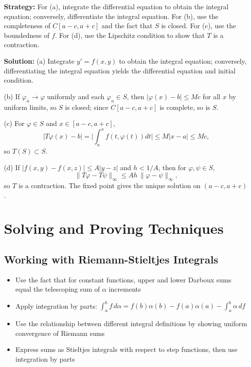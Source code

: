 \noindent\textbf{Strategy:} For (a), integrate the differential equation to obtain the integral equation; conversely, differentiate the integral equation. For (b), use the completeness of $C[a-c,a+c]$ and the fact that $S$ is closed. For (c), use the boundedness of $f$. For (d), use the Lipschitz condition to show that $T$ is a contraction.

\bigskip\noindent\textbf{Solution:}
(a) Integrate $y'=f(x,y)$ to obtain the integral equation; conversely, differentiating the integral equation yields the differential equation and initial condition.

(b) If $\varphi_n\to\varphi$ uniformly and each $\varphi_n\in S$, then $|\varphi(x)-b|\le Mc$ for all $x$ by uniform limits, so $S$ is closed; since $C[a-c,a+c]$ is complete, so is $S$.

(c) For $\varphi\in S$ and $x\in[a-c,a+c]$,
\[|T\varphi(x)-b|=\Big|\int_a^x f(t,\varphi(t))dt\Big|\le M|x-a|\le Mc,
\]
so $T(S)\subset S$.

(d) If $|f(x,y)-f(x,z)|\le A|y-z|$ and $h<1/A$, then for $\varphi,\psi\in S$,
\[\|T\varphi-T\psi\|_\infty\le A h\,\|\varphi-\psi\|_\infty,
\]
so $T$ is a contraction. The fixed point gives the unique solution on $(a-c,a+c)$.
\medskip

\section{Solving and Proving Techniques}

\subsection*{Working with Riemann-Stieltjes Integrals}
\begin{itemize}
\item Use the fact that for constant functions, upper and lower Darboux sums equal the telescoping sum of $\alpha$ increments
\item Apply integration by parts: $\int_a^b f\,d\alpha = f(b)\alpha(b)-f(a)\alpha(a)-\int_a^b \alpha\,df$
\item Use the relationship between different integral definitions by showing uniform convergence of Riemann sums
\item Express sums as Stieltjes integrals with respect to step functions, then use integration by parts
\end{itemize}

